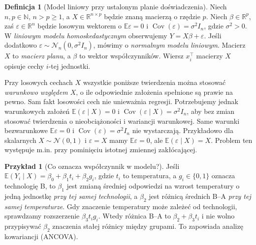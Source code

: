 \documentclass[11pt,a4paper,oneside]{report}
\numberwithin{equation}{chapter}
\theoremstyle{plain}
\theoremstyle{definition}
\newtheorem{definicja}{Definicja}[chapter]
\newtheorem{przyklad}{Przykład}[chapter]
\theoremstyle{remark}
\newcommand{\R}{\mathbb R}
\newcommand{\N}{\mathbb N}
\newcommand{\E}{\mathbb E}
\newcommand{\Cov}{\operatorname{Cov}}
\newcommand{\Normal}{\mathcal N}
\begin{document}
\begin{definicja}[Model liniowy przy ustalonym planie doświadczenia]
\label{def:linear-fixed}
Niech $n,p\in\N$, $n>p\ge1$, a
$X\in\R^{n\times p}$ będzie znaną macierzą o rzędzie $p$.
Niech $\beta\in\R^p$, zaś $\varepsilon\in\R^n$ będzie
losowym wektorem o $\E\varepsilon=0$ i
$\Cov(\varepsilon)=\sigma^2I_n$, gdzie $\sigma^2>0$.
W \emph{liniowym modelu homoskedastycznym} obserwujemy
$Y=X\beta+\varepsilon$. Jeśli dodatkowo
$\varepsilon\sim\mathcal N_n(0,\sigma^2I_n)$, mówimy o
\emph{normalnym modelu liniowym}. Macierz $X$ to
\emph{macierz planu}, a $\beta$ to wektor współczynników.
Wiersz $x_i^\top$ macierzy $X$ opisuje cechy $i$-tej jednostki.
\end{definicja}

Przy losowych cechach $X$ wszystkie poniższe twierdzenia można
stosować \emph{warunkowo względem $X$}, o ile odpowiednie założenia
spełnione są prawie na pewno. Sam fakt losowości cech nie unieważnia
regresji. Potrzebujemy jednak warunkowych założeń
$\E(\varepsilon\mid X)=0$ i
$\Cov(\varepsilon\mid X)=\sigma^2I_n$,
aby bez zmian stosować twierdzenia o nieobciążoności
i wariancji warunkowej. Same warunki bezwarunkowe
$\E\varepsilon=0$ i $\Cov(\varepsilon)=\sigma^2I_n$
nie wystarczają. Przykładowo dla skalarnych
$X\sim\Normal(0,1)$ i $\varepsilon=X$ mamy
$\E\varepsilon=0$, ale $\E(\varepsilon\mid X)=X$.
Problem ten występuje m.in. przy pominięciu
istotnej zmiennej zakłócającej.

\begin{przyklad}[Co oznacza współczynnik w modelu?]
Jeśli $\E(Y_i\mid X)=\beta_0+\beta_1t_i+\beta_2g_i$,
gdzie $t_i$ to temperatura, a $g_i\in\{0,1\}$ oznacza
technologię B, to $\beta_1$ jest zmianą średniej odpowiedzi
na wzrost temperatury o jedną jednostkę \emph{przy tej samej
technologii}, a $\beta_2$ jest różnicą średnich B--A
\emph{przy tej samej temperaturze}. Gdy znaczenie temperatury
może zależeć od technologii, sprawdzamy rozszerzenie
$\beta_3t_ig_i$. Wtedy różnica B--A to
$\beta_2+\beta_3t_i$ i nie wolno przypisywać
$\beta_2$ znaczenia stałej różnicy między grupami.
To zapowiada analizę kowariancji (ANCOVA).
\end{przyklad}
\end{document}
